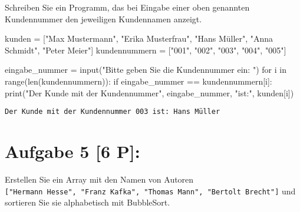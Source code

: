 \documentclass[
  letterpaper,
  DIV=11,
  numbers=noendperiod]{scrartcl}
\newenvironment{Shaded}{\begin{snugshade}}{\end{snugshade}}
\newcommand{\BuiltInTok}[1]{\textcolor[rgb]{0.00,0.23,0.31}{#1}}
\newcommand{\ControlFlowTok}[1]{\textcolor[rgb]{0.00,0.23,0.31}{#1}}
\newcommand{\KeywordTok}[1]{\textcolor[rgb]{0.00,0.23,0.31}{#1}}
\newcommand{\NormalTok}[1]{\textcolor[rgb]{0.00,0.23,0.31}{#1}}
\newcommand{\OperatorTok}[1]{\textcolor[rgb]{0.37,0.37,0.37}{#1}}
\newcommand{\StringTok}[1]{\textcolor[rgb]{0.13,0.47,0.30}{#1}}
\begin{document}
Schreiben Sie ein Programm, das bei Eingabe einer oben genannten
Kundennummer den jeweiligen Kundennamen anzeigt.

\begin{Shaded}
\begin{Highlighting}[]
\NormalTok{kunden }\OperatorTok{=}\NormalTok{ [}\StringTok{"Max Mustermann"}\NormalTok{, }\StringTok{"Erika Musterfrau"}\NormalTok{, }\StringTok{"Hans Müller"}\NormalTok{, }\StringTok{"Anna Schmidt"}\NormalTok{, }\StringTok{"Peter Meier"}\NormalTok{]}
\NormalTok{kundennummern }\OperatorTok{=}\NormalTok{ [}\StringTok{"001"}\NormalTok{, }\StringTok{"002"}\NormalTok{, }\StringTok{"003"}\NormalTok{, }\StringTok{"004"}\NormalTok{, }\StringTok{"005"}\NormalTok{]}

\NormalTok{eingabe\_nummer }\OperatorTok{=} \BuiltInTok{input}\NormalTok{(}\StringTok{"Bitte geben Sie die Kundennummer ein: "}\NormalTok{)}
\ControlFlowTok{for}\NormalTok{ i }\KeywordTok{in} \BuiltInTok{range}\NormalTok{(}\BuiltInTok{len}\NormalTok{(kundennummern)):}
    \ControlFlowTok{if}\NormalTok{ eingabe\_nummer }\OperatorTok{==}\NormalTok{ kundennummern[i]:}
        \BuiltInTok{print}\NormalTok{(}\StringTok{"Der Kunde mit der Kundennummer"}\NormalTok{, eingabe\_nummer, }\StringTok{"ist:"}\NormalTok{, kunden[i])}
\end{Highlighting}
\end{Shaded}

\begin{verbatim}
Der Kunde mit der Kundennummer 003 ist: Hans Müller
\end{verbatim}

\section{Aufgabe 5 {[}6 P{]}:}\label{aufgabe-5-6-p}

Erstellen Sie ein Array mit den Namen von Autoren
\texttt{{[}"Hermann\ Hesse",\ "Franz\ Kafka",\ "Thomas\ Mann",\ "Bertolt\ Brecht"{]}}
und sortieren Sie sie alphabetisch mit BubbleSort.
\end{document}
